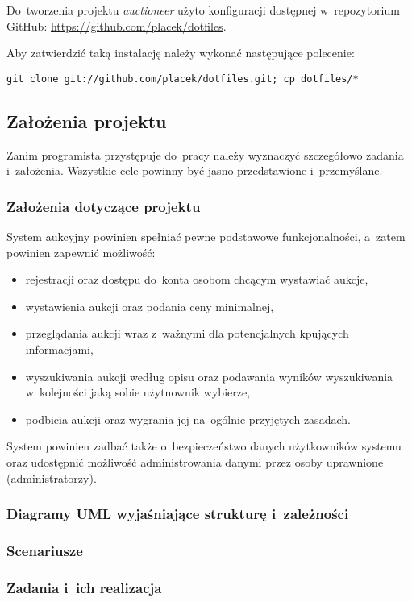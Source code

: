 Do~tworzenia projektu \textit{auctioneer} użyto konfiguracji dostępnej w~repozytorium GitHub: \url{https://github.com/placek/dotfiles}.


Aby zatwierdzić taką instalację należy wykonać następujące polecenie:


\texttt{git clone git://github.com/placek/dotfiles.git; cp dotfiles/* ~}

\subsection{Założenia projektu}

Zanim programista przystępuje do~pracy należy wyznaczyć szczegółowo zadania i~założenia. Wszystkie cele powinny być jasno przedstawione i~przemyślane.

\subsubsection{Założenia dotyczące projektu}

System aukcyjny powinien spełniać pewne podstawowe funkcjonalności, a~zatem powinien zapewnić możliwość:

\begin{itemize}
  \item rejestracji oraz dostępu do~konta osobom chcącym wystawiać aukcje,
  \item wystawienia aukcji oraz podania ceny minimalnej,
  \item przeglądania aukcji wraz z~ważnymi dla potencjalnych kpujących informacjami,
  \item wyszukiwania aukcji według opisu oraz podawania wyników wyszukiwania w~kolejności jaką sobie użytnownik wybierze,
  \item podbicia aukcji oraz wygrania jej na~ogólnie przyjętych zasadach.
\end{itemize}

System powinien zadbać także o~bezpieczeństwo danych użytkowników systemu oraz udostępnić możliwość administrowania danymi przez osoby uprawnione (administratorzy).

\subsubsection{Diagramy UML wyjaśniające strukturę i~zależności}


\subsubsection{Scenariusze}


\subsubsection{Zadania i~ich realizacja}

